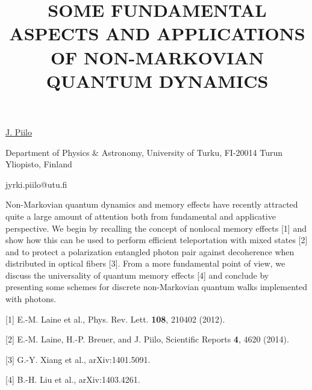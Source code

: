 \title{SOME FUNDAMENTAL ASPECTS AND APPLICATIONS OF NON-MARKOVIAN QUANTUM DYNAMICS}

\underline{J. Piilo}

{\normalsize{\vspace{-4mm}
Department of Physics $\&$ Astronomy,
University of Turku,
FI-20014 Turun Yliopisto,
Finland

\email jyrki.piilo@utu.fi}}

Non-Markovian quantum dynamics and memory effects have recently attracted quite a large amount of attention both from
fundamental and applicative perspective. We begin by recalling the concept of nonlocal memory effects [1] and show how this can
be used to perform efficient teleportation with mixed states [2] and to protect a polarization entangled photon pair against
decoherence when distributed in optical fibers [3]. From a more fundamental point of view,  we discuss the universality of
quantum memory effects [4] and conclude by presenting some schemes for discrete non-Markovian quantum walks implemented
with photons.

{\normalsize

[1] E.-M. Laine et al., Phys. Rev. Lett. \textbf{108}, 210402 (2012).
\vsp

[2] E.-M. Laine, H.-P. Breuer, and J. Piilo, Scientific Reports \textbf{4}, 4620 (2014).
\vsp

[3] G.-Y. Xiang et al., arXiv:1401.5091.
\vsp

[4] B.-H. Liu et al., arXiv:1403.4261.
}

\vspace{\baselineskip}
